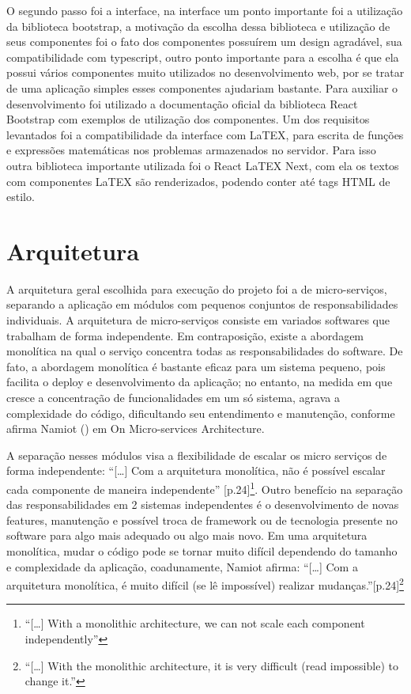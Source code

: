 O segundo passo foi a interface, na interface um ponto importante foi a utilização da biblioteca bootstrap, a motivação da escolha dessa biblioteca e utilização de seus componentes foi o fato dos componentes possuírem um design agradável, sua compatibilidade com typescript, outro ponto importante para a escolha é que ela possui vários componentes muito utilizados no desenvolvimento web, por se tratar de uma aplicação simples esses componentes ajudariam bastante. Para auxiliar o desenvolvimento foi utilizado a documentação oficial da biblioteca React Bootstrap com exemplos de utilização dos componentes. Um dos requisitos levantados foi a compatibilidade da interface com LaTEX, para escrita de funções e expressões matemáticas nos problemas armazenados no servidor. Para isso outra biblioteca importante utilizada foi o React LaTEX Next, com ela os textos com componentes LaTEX são renderizados, podendo conter até tags HTML de estilo.

\section{Arquitetura}

A arquitetura geral escolhida para execução do projeto foi a de micro-serviços, separando a aplicação em módulos com pequenos conjuntos de responsabilidades individuais. A arquitetura de micro-serviços consiste em variados softwares que trabalham de forma independente. Em contraposição, existe a abordagem monolítica na qual o serviço concentra todas as responsabilidades do software. De fato, a abordagem monolítica é bastante eficaz para um sistema pequeno, pois facilita o deploy e desenvolvimento da aplicação; no entanto, na medida em que cresce a concentração de funcionalidades em um só sistema, agrava a complexidade do código, dificultando seu entendimento e manutenção, conforme afirma Namiot (\citeyear{namiot_d:OMSA}) em On Micro-services Architecture.

A separação nesses módulos visa a flexibilidade de escalar os micro serviços de forma independente: ``[\dots] Com a arquitetura monolítica, não é possível escalar cada componente de maneira independente'' \cite[tradução nossa]{namiot_d:OMSA}[p.24]\footnote{``[\dots] With a monolithic architecture, we can not scale each component independently''}. Outro benefício na separação das responsabilidades em 2 sistemas independentes é o desenvolvimento de novas features, manutenção e possível troca de framework ou de tecnologia presente no software para algo mais adequado ou algo mais novo. Em uma arquitetura monolítica, mudar o código pode se tornar muito difícil dependendo do tamanho e complexidade da aplicação, coadunamente, Namiot afirma: ``[\dots] Com a arquitetura monolítica, é muito difícil (se lê impossível) realizar mudanças.''\cite[tradução nossa]{namiot_d:OMSA}[p.24]\footnote{``[\dots] With the monolithic architecture, it is very difficult (read impossible) to change it.''}

